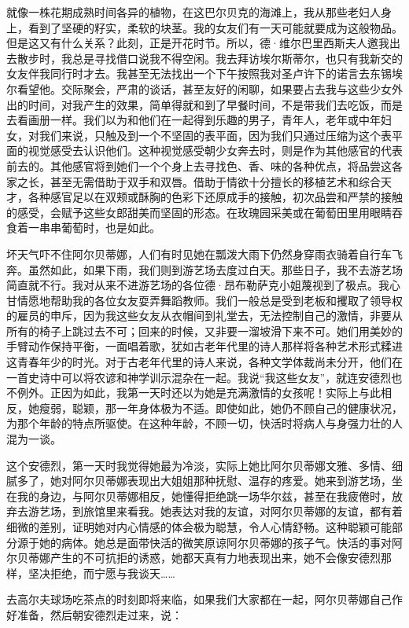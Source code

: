 \par 就像一株花期成熟时间各异的植物，在这巴尔贝克的海滩上，我从那些老妇人身上，看到了坚硬的籽实，柔软的块茎。我的女友们有一天可能就要成为这般物品。但是这又有什么关系？此刻，正是开花时节。所以，德·维尔巴里西斯夫人邀我出去散步时，我总是寻找借口说我不得空闲。我去拜访埃尔斯蒂尔，也只有我新交的女友伴我同行时才去。我甚至无法找出一个下午按照我对圣卢许下的诺言去东锡埃尔看望他。交际聚会，严肃的谈话，甚至友好的闲聊，如果要占去我与这些少女外出的时间，对我产生的效果，简单得就和到了早餐时间，不是带我们去吃饭，而是去看画册一样。我们以为和他们在一起得到乐趣的男子，青年人，老年或中年妇女，对我们来说，只触及到一个不坚固的表平面，因为我们只通过压缩为这个表平面的视觉感受去认识他们。这种视觉感受朝少女奔去时，则是作为其他感官的代表前去的。其他感官将到她们一个个身上去寻找色、香、味的各种优点，将品尝这各家之长，甚至无需借助于双手和双唇。借助于情欲十分擅长的移植艺术和综合天才，各种感官足以在双颊或酥胸的色彩下还原成手的接触，初次品尝和严禁的接触的感受，会赋予这些女郎甜美而坚固的形态。在玫瑰园采美或在葡萄田里用眼睛吞食着一串串葡萄时，也是如此。
\par 坏天气吓不住阿尔贝蒂娜，人们有时见她在瓢泼大雨下仍然身穿雨衣骑着自行车飞奔。虽然如此，如果下雨，我们则到游艺场去度过白天。那些日子，我不去游艺场简直就不行。我对从来不进游艺场的各位德·昂布勒萨克小姐蔑视到了极点。我心甘情愿地帮助我的各位女友耍弄舞蹈教师。我们一般总是受到老板和攫取了领导权的雇员的申斥，因为我这些女友从衣帽间到礼堂去，无法控制自己的激情，非要从所有的椅子上跳过去不可；回来的时候，又非要一溜坡滑下来不可。她们用美妙的手臂动作保持平衡，一面唱着歌，犹如古老年代里的诗人那样将各种艺术形式糅进这青春年少的时光。对于古老年代里的诗人来说，各种文学体裁尚未分开，他们在一首史诗中可以将农谚和神学训示混杂在一起。我说“我这些女友”，就连安德烈也不例外。正因为如此，我第一天时还以为她是充满激情的女孩呢！实际上与此相反，她瘦弱，聪颖，那一年身体极为不适。即使如此，她仍不顾自己的健康状况，为那个年龄的特点所驱使。在这种年龄，不顾一切，快活时将病人与身强力壮的人混为一谈。
\par 这个安德烈，第一天时我觉得她最为冷淡，实际上她比阿尔贝蒂娜文雅、多情、细腻多了，她对阿尔贝蒂娜表现出大姐姐那种抚慰、温存的疼爱。她来到游艺场，坐在我的身边，与阿尔贝蒂娜相反，她懂得拒绝跳一场华尔兹，甚至在我疲倦时，放弃去游艺场，到旅馆里来看我。她表达对我的友谊，对阿尔贝蒂娜的友谊，都有着细微的差别，证明她对内心情感的体会极为聪慧，令人心情舒畅。这种聪颖可能部分源于她的病体。她总是面带快活的微笑原谅阿尔贝蒂娜的孩子气。快活的事对阿尔贝蒂娜产生的不可抗拒的诱惑，她都天真有力地表现出来，她不会像安德烈那样，坚决拒绝，而宁愿与我谈天……
\par 去高尔夫球场吃茶点的时刻即将来临，如果我们大家都在一起，阿尔贝蒂娜自己作好准备，然后朝安德烈走过来，说：
